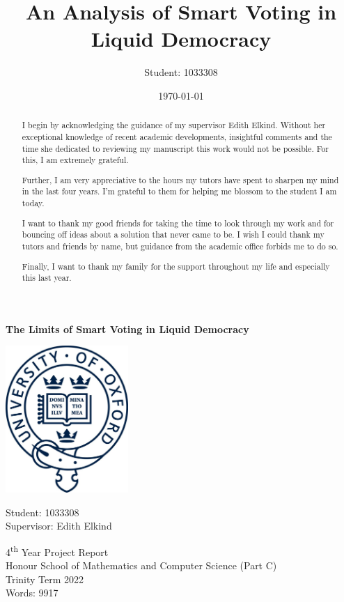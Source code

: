 \documentclass[11pt,a4paper, titlepage]{article}
\title{An Analysis of Smart Voting in Liquid Democracy}
\author{Student: 1033308}
\date{\today}
\theoremstyle{definition}
\begin{document}
\begin{titlepage}
    \begin{center}
        \huge
        \textbf{The Limits of Smart Voting in Liquid Democracy}

        \vfill
        
        \includegraphics[width=0.35\textwidth]{logo.jpeg}
        
        \vfill
        
        \LARGE
        Student: 1033308 \\
        \Large
        Supervisor: Edith Elkind\\
        
        \vspace*{1.5cm}
        
        4\textsuperscript{th} Year Project Report\\
        \vspace*{2pt}
        Honour School of Mathematics and Computer Science (Part C)\\
        \vspace*{.5cm}
        Trinity Term 2022 \\
        Words: 9917
    \end{center}

\end{titlepage}

\renewcommand{\abstractname}{Acknowledgements}
\begin{abstract}
    I begin by acknowledging the guidance of my supervisor Edith Elkind. Without her exceptional knowledge of recent academic developments, insightful comments and the time she dedicated to reviewing my manuscript this work would not be possible.
For this, I am extremely grateful.

Further, I am very appreciative to the hours my tutors have spent to sharpen my mind in the last four years. I'm grateful to them for helping me blossom to the student I am today.

I want to thank my good friends for taking the time to look through my work and for bouncing off ideas about a solution that never came to be.
I wish I could thank my tutors and friends by name, but guidance from the academic office forbids me to do so.

Finally, I want to thank my family for the support throughout my life and especially this last year.

\end{abstract}
\end{document}
